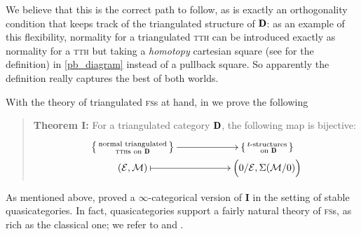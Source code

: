 We believe that this is the correct path to follow, as \adef{} is exactly an orthogonality condition that keeps track of the triangulated structure of $\cD$: as an example of this flexibility, normality for a triangulated \textsc{tth} can be introduced exactly as normality for a \textsc{tth} but taking a \emph{homotopy} cartesian square (see  for the definition) in \eqref{pb_diagram} instead of a pullback square. So apparently the definition really captures the best of both worlds.

With the theory of triangulated \textsc{fs}s at hand, in  we prove the following
\begin{quote}
\textbf{Theorem I:} For a triangulated category $\cD$, the following map is bijective:
\[
\xymatrix@R=0pt{
\left\{
{\begin{smallmatrix}
\text{normal triangulated}\\
\text{\textsc{tth}s on }\cD
\end{smallmatrix}}
\right\}
\ar[rr]&&
\left\{
{\begin{smallmatrix}
\text{$t$-structures}\\
\text{ on }\cD
\end{smallmatrix}}
\right\}\\
(\E,\M) \ar@{|->}[rr]&& \Big(0/\E, \Sigma(\M/0)\Big)
}
\]
\end{quote}
As mentioned above, \cite{Fiorenza2014} proved a $\infty$\hyp{}categorical version of \athm\textbf{I} in the setting of stable quasicategories. In fact, quasicategories support a fairly natural theory of \textsc{fs}s, as rich as the classical one; we refer to \cite{joyal2008notes} and \cite{HTT}.%


